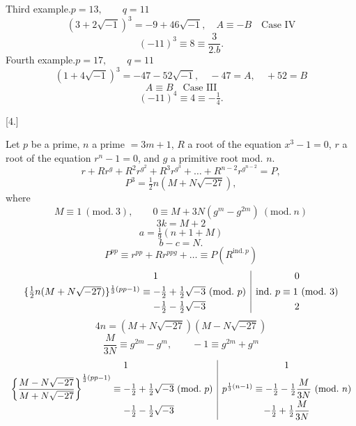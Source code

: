 \noindent{}\hspace*{\parindent}Third example.\qquad $p=13,\qquad q=11$
\[(3+2\sqrt{-1})^3=-9+46\sqrt{-1},\quad A\equiv-B\quad\text{Case IV}\]
\[(-11)^3\equiv8\equiv\dfrac{3}{2.b}.\]
\noindent\hspace*{\parindent}Fourth example.\qquad $p=17,\qquad q=11$
\[(1+4\sqrt{-1})^3=-47-52\sqrt{-1},\quad-47=A,\quad+52=B\]
\[A\equiv B\quad\text{Case III}\]
\[(-11)^4\equiv4\equiv-\tfrac14.\]
\begin{center}[4.]\end{center}
\noindent\hspace*{\parindent}Let $p$ be a prime, $n$ a prime $=3m+1$, $R$ a root of the equation $x^3-1=0$, $r$ a root of the equation $r^n-1=0$, and $g$ a primitive root mod. $n$.
\[r+Rr^g+R^2r^{g^2}+R^3r^{g^3}+\ldots+R^{n-2}r^{g^{n-2}}=P,\]
\[P^3=\tfrac12 n(M+N\sqrt{-27}),\]
\noindent where
\[M\equiv1\ (\mathrm{mod.}\ 3),\qquad0\equiv M+3N(g^m-g^{2m})\ (\mathrm{mod.}\ n)\]
\[3k=M+2\]
\[a=\tfrac19(n+1+M)\]
\[b-c=N.\]
\[P^{pp}\equiv r^{pp}+Rr^{ppg}+\ldots\equiv P(R^{\mathrm{ind.}\,p})\]
\begingroup\footnotesize
\[\begin{array}{r@{}l|c}
&1&0\\[3pt]
\{\tfrac12 n(M+N\sqrt{-27})\}^{\frac13(pp-1)}\equiv{}&-\tfrac12+\tfrac12\sqrt{-3}\ (\mathrm{mod.}\ p)&\mathrm{ind.}\ p\equiv1\ (\mathrm{mod.}\ 3)\\[3pt]
&-\tfrac12-\tfrac12\sqrt{-3}&2
\end{array}\]
\endgroup
\[4n=(M+N\sqrt{-27})(M-N\sqrt{-27})\]
\[\dfrac{M}{3N}\equiv g^{2m}-g^m,\qquad-1\equiv g^{2m}+g^m\]
\begingroup\footnotesize
\[\begin{array}{r@{}l|c}
&1&1\\[3pt]
\left\{\dfrac{M-N\sqrt{-27}}{M+N\sqrt{-27}}\right\}^{\frac13(pp-1)}\equiv{}&-\tfrac12+\tfrac12\sqrt{-3}\ (\mathrm{mod.}\ p)&p^{\frac13(n-1)}\equiv-\tfrac12-\tfrac12\dfrac{M}{3N}\ (\mathrm{mod.}\ n)\\[5pt]
&-\tfrac12-\tfrac12\sqrt{-3}&-\tfrac12+\tfrac12\dfrac{M}{3N}
\end{array}\]
\endgroup
